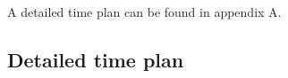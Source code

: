 \documentclass[a4paper, 12pt]{article}
\begin{document}
A detailed time plan can be found in appendix A\@.

\begin{refsection}
\nocite{*}
\printbibliography[heading=bibnumbered, title={Literature Base}, subtype=litbase, prefixnumbers={LB}]
\end{refsection}

\printbibliography[heading=bibnumbered, notsubtype=litbase]

\newpage

\begin{appendices}

\section{Detailed time plan}
\label{app:timeplan}



\end{appendices}
\end{document}
